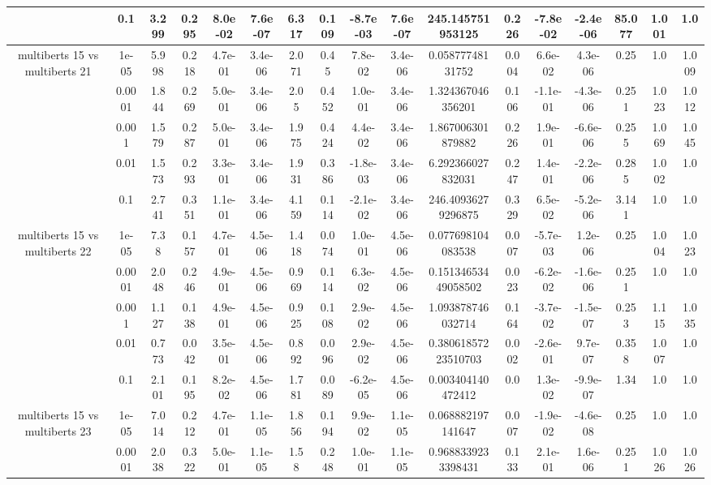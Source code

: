 \begin{tabular}{|c|c|c|c|c|c|c|c|c|c|c|c|c|c|c|c|c|}
 & 0.1 & 3.299 & 0.295 & 8.0e-02 & 7.6e-07 & 6.317 & 0.109 & -8.7e-03 & 7.6e-07 & 245.145751953125 & 0.226 & -7.8e-02 & -2.4e-06 & 85.077 & 1.001 & 1.0 \\
\hline
\multirow{5}{*}{multiberts 15 vs multiberts 21} & 1e-05 & 5.998 & 0.218 & 4.7e-01 & 3.4e-06 & 2.071 & 0.45 & 7.8e-02 & 3.4e-06 & 0.05877748131752 & 0.004 & 6.6e-02 & 4.3e-06 & 0.25 & 1.0 & 1.009 \\
 & 0.0001 & 1.844 & 0.269 & 5.0e-01 & 3.4e-06 & 2.05 & 0.452 & 1.0e-01 & 3.4e-06 & 1.324367046356201 & 0.106 & -1.1e-01 & -4.3e-06 & 0.251 & 1.023 & 1.012 \\
 & 0.001 & 1.579 & 0.287 & 5.0e-01 & 3.4e-06 & 1.975 & 0.424 & 4.4e-02 & 3.4e-06 & 1.867006301879882 & 0.226 & 1.9e-01 & -6.6e-06 & 0.255 & 1.069 & 1.045 \\
 & 0.01 & 1.573 & 0.293 & 3.3e-01 & 3.4e-06 & 1.931 & 0.386 & -1.8e-03 & 3.4e-06 & 6.292366027832031 & 0.247 & 1.4e-01 & -2.2e-06 & 0.285 & 1.002 & 1.0 \\
 & 0.1 & 2.741 & 0.351 & 1.1e-01 & 3.4e-06 & 4.159 & 0.114 & -2.1e-02 & 3.4e-06 & 246.40936279296875 & 0.329 & 6.5e-02 & -5.2e-06 & 3.141 & 1.0 & 1.0 \\
\hline
\multirow{5}{*}{multiberts 15 vs multiberts 22} & 1e-05 & 7.38 & 0.157 & 4.7e-01 & 4.5e-06 & 1.418 & 0.074 & 1.0e-01 & 4.5e-06 & 0.077698104083538 & 0.007 & -5.7e-03 & 1.2e-06 & 0.25 & 1.004 & 1.023 \\
 & 0.0001 & 2.048 & 0.246 & 4.9e-01 & 4.5e-06 & 0.969 & 0.114 & 6.3e-02 & 4.5e-06 & 0.15134653449058502 & 0.023 & -6.2e-02 & -1.6e-06 & 0.251 & 1.0 & 1.0 \\
 & 0.001 & 1.127 & 0.138 & 4.9e-01 & 4.5e-06 & 0.925 & 0.108 & 2.9e-02 & 4.5e-06 & 1.093878746032714 & 0.164 & -3.7e-02 & -1.5e-07 & 0.253 & 1.115 & 1.035 \\
 & 0.01 & 0.773 & 0.042 & 3.5e-01 & 4.5e-06 & 0.892 & 0.096 & 2.9e-02 & 4.5e-06 & 0.38061857223510703 & 0.002 & -2.6e-01 & 9.7e-07 & 0.358 & 1.007 & 1.0 \\
 & 0.1 & 2.101 & 0.195 & 8.2e-02 & 4.5e-06 & 1.781 & 0.089 & -6.2e-05 & 4.5e-06 & 0.003404140472412 & 0.0 & 1.3e-02 & -9.9e-07 & 1.34 & 1.0 & 1.0 \\
\hline
\multirow{5}{*}{multiberts 15 vs multiberts 23} & 1e-05 & 7.014 & 0.212 & 4.7e-01 & 1.1e-05 & 1.856 & 0.194 & 9.9e-02 & 1.1e-05 & 0.068882197141647 & 0.007 & -1.9e-02 & -4.6e-08 & 0.25 & 1.0 & 1.0 \\
 & 0.0001 & 2.038 & 0.322 & 5.0e-01 & 1.1e-05 & 1.58 & 0.248 & 1.0e-01 & 1.1e-05 & 0.9688339233398431 & 0.133 & 2.1e-01 & 1.6e-06 & 0.251 & 1.026 & 1.026 \\

\end{tabular}
